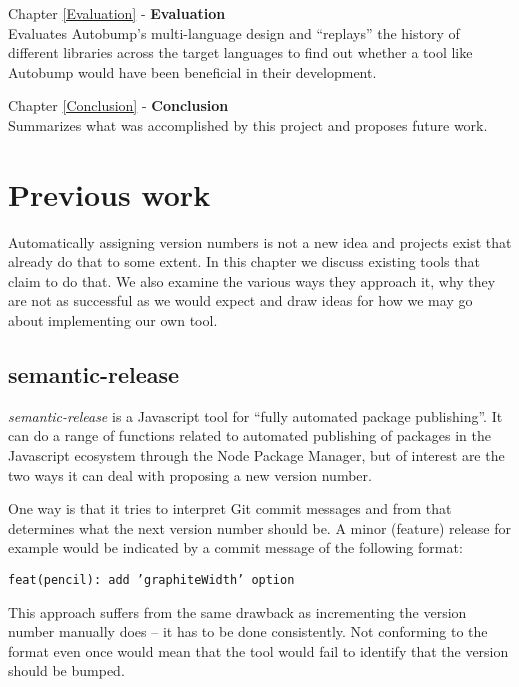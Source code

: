 \documentclass{l4proj}
\begin{document}
\noindent Chapter \ref{Evaluation} - \textbf{Evaluation} \\
Evaluates Autobump's multi-language design and ``replays'' the history
of different libraries across the target languages to find out whether
a tool like Autobump would have been beneficial in their development.

\noindent Chapter \ref{Conclusion} - \textbf{Conclusion} \\
Summarizes what was accomplished by this project and proposes future work.

\chapter{Previous work}
\label{PreviousWork}

Automatically assigning version numbers is not a new idea and projects
exist that already do that to some extent. In this chapter we discuss
existing tools that claim to do that. We also examine the various
ways they approach it, why they are not as successful as we would
expect and draw ideas for how we may go about implementing our own tool.

\section{semantic-release}

\textit{semantic-release} \cite{SemanticRelease} is a Javascript tool
for ``fully automated package publishing''. It can do a range of
functions related to automated publishing of packages in the
Javascript ecosystem through the Node Package Manager, but of interest
are the two ways it can deal with proposing a new version number.

One way is that it tries to interpret Git commit messages and from
that determines what the next version number should be. A minor
(feature) release for example would be indicated by a commit message
of the following format:

\begin{center}
\texttt{feat(pencil): add 'graphiteWidth' option}
\end{center}

This approach suffers from the same drawback as incrementing the
version number manually does -- it has to be done consistently.
Not conforming to the format even once would mean that the tool would
fail to identify that the version should be bumped.
\end{document}
